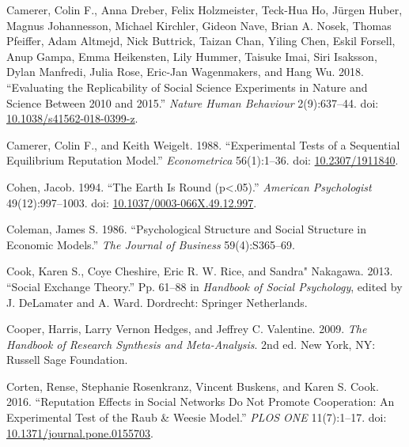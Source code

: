 \documentclass[
  11pt,
]{article}
\newlength{\cslhangindent}
\newlength{\cslentryspacingunit} %
\newenvironment{CSLReferences}[2] %
 {%
  \setlength{\parindent}{0pt}
  \ifodd #1
  \let\oldpar\par
  \def\par{\hangindent=\cslhangindent\oldpar}
  \fi
  \setlength{\parskip}{#2\cslentryspacingunit}
 }%
 {}
\begin{document}
\begin{CSLReferences}{1}{0}
\leavevmode{}%
Camerer, Colin F., Anna Dreber, Felix Holzmeister, Teck-Hua Ho, Jürgen Huber, Magnus Johannesson, Michael Kirchler, Gideon Nave, Brian A. Nosek, Thomas Pfeiffer, Adam Altmejd, Nick Buttrick, Taizan Chan, Yiling Chen, Eskil Forsell, Anup Gampa, Emma Heikensten, Lily Hummer, Taisuke Imai, Siri Isaksson, Dylan Manfredi, Julia Rose, Eric-Jan Wagenmakers, and Hang Wu. 2018. {``Evaluating the Replicability of Social Science Experiments in Nature and Science Between 2010 and 2015.''} \emph{Nature Human Behaviour} 2(9):637--44. doi: \href{https://doi.org/10.1038/s41562-018-0399-z}{10.1038/s41562-018-0399-z}.

\leavevmode{}%
Camerer, Colin F., and Keith Weigelt. 1988. {``Experimental Tests of a Sequential Equilibrium Reputation Model.''} \emph{Econometrica} 56(1):1--36. doi: \href{https://doi.org/10.2307/1911840}{10.2307/1911840}.

\leavevmode{}%
Cohen, Jacob. 1994. {``The Earth Is Round (p{\enspace}\textless{}{\enspace}.05).''} \emph{American Psychologist} 49(12):997--1003. doi: \href{https://doi.org/10.1037/0003-066X.49.12.997}{10.1037/0003-066X.49.12.997}.

\leavevmode{}%
Coleman, James S. 1986. {``Psychological Structure and Social Structure in Economic Models.''} \emph{The Journal of Business} 59(4):S365--69.

\leavevmode{}%
Cook, Karen S., Coye Cheshire, Eric R. W. Rice, and Sandra" Nakagawa. 2013. {``Social Exchange Theory.''} Pp. 61--88 in \emph{Handbook of {S}ocial {P}sychology}, edited by J. DeLamater and A. Ward. Dordrecht: Springer Netherlands.

\leavevmode{}%
Cooper, Harris, Larry Vernon Hedges, and Jeffrey C. Valentine. 2009. \emph{The Handbook of Research Synthesis and Meta-Analysis}. 2nd ed. New York, NY: Russell Sage Foundation.

\leavevmode{}%
Corten, Rense, Stephanie Rosenkranz, Vincent Buskens, and Karen S. Cook. 2016. {``Reputation Effects in Social Networks Do Not Promote Cooperation: An Experimental Test of the Raub \& Weesie Model.''} \emph{PLOS ONE} 11(7):1--17. doi: \href{https://doi.org/10.1371/journal.pone.0155703}{10.1371/journal.pone.0155703}.


\end{CSLReferences}
\end{document}
